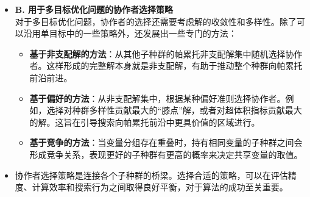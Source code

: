 \begin{itemize}
\begin{itemize}
\begin{itemize}
            \item \textbf{基于存档的协作者选择}：维护一个记录优秀协作者的存档，个体只与存档中的协作者组合。存档可以是帕累托前沿的非支配解，或者是那些能够有效区分个体优劣的“信息性”协作者。这可以大大减少评估次数。
            \item \textbf{混合协作者选择}：结合多种策略。例如，经典的“最优+随机”策略，先用最优协作者构建一个解，再与几个随机协作者构建解，取其中最佳作为适应度。这种方法简单有效，兼顾了贪婪性和多样性。
            \item \textbf{自适应协作者选择}：协作者数量或选择策略可以随时间变化。例如，早期使用更多协作者以充分探索，后期减少协作者以加速收敛。
        \end{itemize}
    \end{itemize}
    \item \textbf{B. 用于多目标优化问题的协作者选择策略} \\
    对于多目标优化问题，协作者的选择还需要考虑解的收敛性和多样性。除了可以沿用单目标中的一些策略外，还发展出一些专门的方法：
    \begin{itemize}
        \item \textbf{基于非支配解的方法}：从其他子种群的帕累托非支配解集中随机选择协作者。这样形成的完整解本身就是非支配解，有助于推动整个种群向帕累托前沿前进。
        \item \textbf{基于偏好的方法}：从非支配解集中，根据某种偏好准则选择协作者。例如，选择对种群多样性贡献最大的“膝点”解，或者对超体积指标贡献最大的解。这旨在引导搜索向帕累托前沿中更具价值的区域进行。
        \item \textbf{基于竞争的方法}：当变量分组存在重叠时，持有相同变量的子种群之间会形成竞争关系，表现更好的子种群有更高的概率来决定共享变量的取值。
    \end{itemize}
    \item 协作者选择策略是连接各个子种群的桥梁。选择合适的策略，可以在评估精度、计算效率和搜索行为之间取得良好平衡，对于算法的成功至关重要。
\end{itemize}

